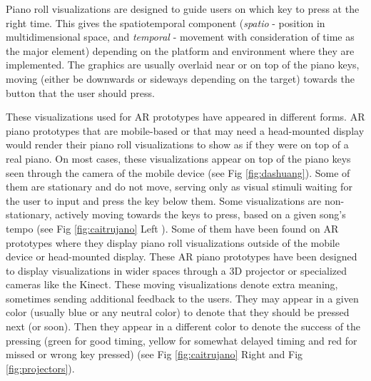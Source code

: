 \documentclass[manuscript,screen]{acmart}
\begin{document}
Piano roll visualizations are designed to guide users on which key to press at the right time. This gives the spatiotemporal component (\textit{spatio} - position in multidimensional space, and \textit{temporal} - movement with consideration of time as the major element) depending on the platform and environment where they are implemented. The graphics are usually overlaid near or on top of the piano keys, moving (either be downwards or sideways depending on the target) towards the button that the user should press. 

These visualizations used for AR prototypes have appeared in different forms. AR piano prototypes that are mobile-based or that may need a head-mounted display would render their piano roll visualizations to show as if they were on top of a real piano. On most cases, these visualizations appear on top of the piano keys seen through the camera of the mobile device (see Fig \ref{fig:dashuang}). Some of them are stationary and do not move, serving only as visual stimuli waiting for the user to input and press the key below them. Some visualizations are non-stationary, actively moving towards the keys to press, based on a given song's tempo (see Fig \ref{fig:caitrujano} Left ). Some of them have been found on AR prototypes where they display piano roll visualizations outside of the mobile device or head-mounted display. These AR piano prototypes have been designed to display visualizations in wider spaces through a 3D projector or specialized cameras like the Kinect. These moving visualizations denote extra meaning, sometimes sending additional feedback to the users. They may appear in a given color (usually blue or any neutral color) to denote that they should be pressed next (or soon). Then they appear in a different color to denote the success of the pressing (green for good timing, yellow for somewhat delayed timing and red for missed or wrong key pressed) (see Fig \ref{fig:caitrujano} Right and Fig \ref{fig:projectors}). 
\end{document}
